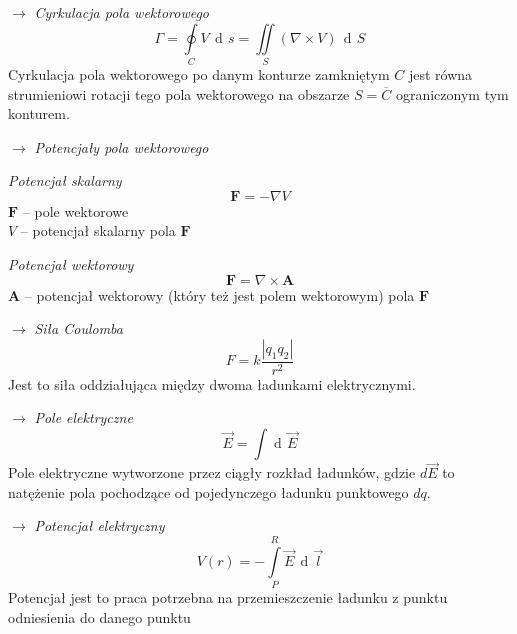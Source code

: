 \documentclass[12pt]{article}
\newenvironment{wzor}[1]{\par{\Large $\longrightarrow$ \textit{#1}}}
    {\newline {\color{grey} \rule{\linewidth}{0.3pt}}}
\DeclareMathOperator{\der}{\operatorname{d}\!}
\begin{document}
\newpage

\begin{wzor}{Cyrkulacja pola wektorowego}
    \begin{equation}
        \Gamma = \oint\limits_C V \, \der s = \iint\limits_S (\nabla \times V) \, \der S
    \end{equation}
    Cyrkulacja pola wektorowego po danym konturze zamkniętym $C$ jest równa strumieniowi
    rotacji tego pola wektorowego na obszarze $S = \overline{C}$ ograniczonym tym konturem.
\end{wzor}

\begin{wzor}{Potencjały pola wektorowego}
    \par \textit{Potencjał skalarny}
    \begin{equation}
        \mathbf{F} = - \nabla V
    \end{equation}
    $\mathbf{F}$ -- pole wektorowe\\
    $V$ -- potencjał skalarny pola $\mathbf{F}$
    \par \textit{Potencjał wektorowy}
    \begin{equation}
        \mathbf{F} = \nabla \times \mathbf{A}
    \end{equation}
    $\mathbf{A}$ -- potencjał wektorowy (który też jest polem wektorowym) pola $\mathbf{F}$
\end{wzor}

\begin{wzor}{Siła Coulomba}
    \begin{equation}
        F = k \frac{|q_1 q_2|}{r^2}
    \end{equation}
    Jest to siła oddziałująca między dwoma ładunkami elektrycznymi.
\end{wzor}

\begin{wzor}{Pole elektryczne}
    \begin{equation}
        \Vec{E} = \int \der \Vec{E}
    \end{equation}
    Pole elektryczne wytworzone przez ciągły rozkład ładunków, gdzie $d\Vec{E}$ to
    natężenie pola pochodzące od pojedynczego ładunku punktowego $dq$.
\end{wzor}

\begin{wzor}{Potencjał elektryczny}
    \begin{equation}
        V(r) = - \int\limits_P^R \Vec{E} \, \der\Vec{l}
    \end{equation}
    Potencjał jest to praca potrzebna na przemieszczenie ładunku z punktu odniesienia
    do danego punktu
\end{wzor}
\end{document}
